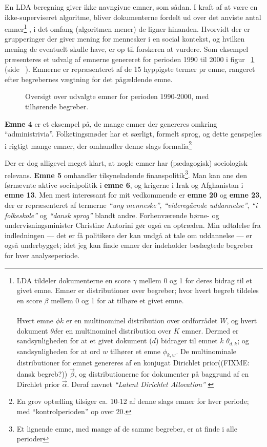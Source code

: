 En LDA beregning giver ikke navngivne emner, som sådan.
I kraft af at være en ikke-superviseret algoritme, bliver dokumenterne fordelt ud over det anviste antal emner\footnote{LDA tildeler dokumenterne en score $\gamma$ mellem 0 og 1 for deres bidrag til et givet emne. Emner er distributioner over begreber; hvor hvert begreb tildeles en score $\beta$ mellem 0 og 1 for at tilhøre et givet emne. \\ \\ Hvert emne $\phi k$ er en multinominel distribution over ordforrådet $W$, og hvert dokument $\theta  d$er en multinominel distribution over $K$ emner. Dermed er sandsynligheden for at et givet dokument ($d$) bidrager til emnet $k$ $\theta _{d,k}$; og sandsynligheden for at ord $w$ tilhører et emne $\phi _{k,w}$. De multinominale distributioner for emnet genereres af en konjugat Dirichlet prior((FIXME: dansk begreb?)) $\overrightarrow{\beta}$, og distributionerne for dokumenter på baggrund af en Dirchlet prior $\overrightarrow{\alpha}$. Deraf navnet \textit{“Latent Dirichlet Allocation”} \autocite[s.65f]{deveaudAccurateEffectiveLatent2014}} , i det omfang (algoritmen mener) de ligner hinanden.
Hvorvidt der er grupperinger der giver mening for mennesker i en social kontekst, og hvilken mening de eventuelt skulle have, er op til forskeren at vurdere.
Som eksempel præsenteres et udvalg af emnerne genereret for perioden 1990 til 2000 i figur ~\ref{fig:termsFull} (side ~\pageref{fig:termsFull}).
Emnerne er repræsenteret af de 15 hyppigste termer pr emne, rangeret efter begrebernes vægtning for det pågældende emne.

\begin{figure}
\begin{adjustwidth}{-1in}{-1in}
  
\end{adjustwidth}
\caption{Oversigt over udvalgte emner for perioden 1990-2000, med tilhørende begreber.}
\label{fig:termsFull}
\end{figure}

\textbf{Emne 4} er et eksempel på, de mange emner der genereres omkring “administrivia”.
Folketingsmøder har et særligt, formelt sprog, og dette genspejles i rigtigt mange emner, der omhandler denne slags formalia\footnote{En grov optælling tilsiger ca. 10-12 af denne slags emner for hver periode; med “kontrolperioden” op over 20.}

Der er dog alligevel meget klart, at nogle emner har (pædagogisk) sociologisk relevans.
\textbf{Emne 5} omhandler tilsyneladende finanspolitik\footnote{Et lignende emne, med mange af de samme begreber, er at finde i alle perioder}.
Man kan ane den førnævnte aktive socialpolitik i \textbf{emne 6}, og krigerne i Irak og Afghanistan i \textbf{emne 13}.
Men mest interessant for mit vedkommende er \textbf{emne 20} og \textbf{emne 23}, der er repræsenteret af termerne \textit{“ung menneske”}, \textit{“videregående uddannelse”}, \textit{“i folkeskole”} og \textit{“dansk sprog”} blandt andre.
Forhenværende børne- og undervisningsminister Christine Antorini gør også en optræden.
Min udtalelse fra indledningen --- det er få politikere der kan undgå at tale om uddannelse — er også underbygget; idet jeg kan finde emner der indeholder beslægtede begreber for hver analyseperiode.

